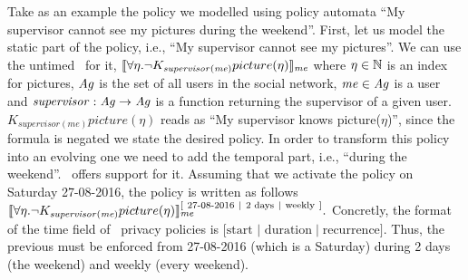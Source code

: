   \begin{example}
  Take as an example the policy we modelled using policy automata ``My supervisor cannot see my pictures during the weekend''. First, let us model the static part of the policy, i.e., ``My supervisor cannot see my pictures''. We can use the untimed \ppl~for it,
  $ \llbracket \forall \eta. \neg K_{\mathit{supervisor(me)}} picture(\eta) \rrbracket_{\mathit{me}}$
  where $\eta \in \mathbb{N}$ is an index for pictures, $\mathit{Ag}$ is the set of all users in the social network, $\mathit{me} \in \mathit{Ag}$ is a user and $\mathit{supervisor} : \mathit{Ag} \rightarrow \mathit{Ag}$ is a function returning the supervisor of a given user. $K_{\mathit{supervisor(me)}} picture(\eta)$ reads as ``My supervisor knows picture($\eta$)'', since the formula is negated we state the desired policy. In order to transform this policy into an evolving one we need to add the temporal part, i.e., ``during the weekend''. \tppl~offers support for it. Assuming that we activate the policy on Saturday 27-08-2016, the policy is written as follows
  $\llbracket \forall \eta. \neg K_{\mathit{supervisor(me)}} picture(\eta) \rrbracket_{\mathit{me}}^{[ ~ \text{27-08-2016} ~ \mid ~ \text{2 days} ~ \mid ~ \text{weekly} ~ ]}.$
  Concretly, the format of the time field of \tppl~privacy policies is $[\text{start} $ $\mid $ $\text{duration} \mid \text{recurrence} ]$. Thus, the previous must be enforced from 27-08-2016 (which is a Saturday) during 2 days (the weekend) and weekly (every weekend).
    \end{example}
